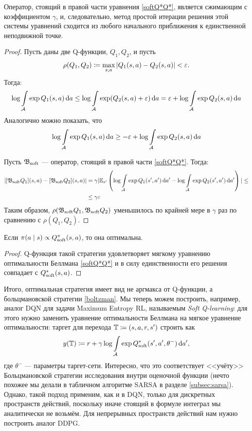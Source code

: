 \begin{theorem}
Оператор, стоящий в правой части уравнения \eqref{softQ*Q*}, является сжимающим с коэффициентом $\gamma$, и, следовательно, метод простой итерации решения этой системы уравнений сходится из любого начального приближения к единственной неподвижной точке.
\begin{proof}
Пусть даны две Q-функции, $Q_1, Q_2$, и пусть 
$$\rho(Q_1, Q_2) \coloneqq \max\limits_{s, a} | Q_1(s, a) \HM- Q_2(s, a) | \HM< \eps.$$
Тогда:
$$
\log \int\limits_{\mathcal{A}} \exp Q_1(s, a) \mathop{}\!\mathrm{d} a \le \log \int\limits_{\mathcal{A}} \exp (Q_2(s, a) + \varepsilon) \mathop{}\!\mathrm{d} a = \varepsilon + \log \int\limits_{\mathcal{A}} \exp Q_2(s, a) \mathop{}\!\mathrm{d} a
$$
Аналогично можно показать, что 
$$
\log \int\limits_{\mathcal{A}} \exp Q_1(s, a) \mathop{}\!\mathrm{d} a \ge -\varepsilon + \log \int\limits_{\mathcal{A}} \exp Q_2(s, a) \mathop{}\!\mathrm{d} a
$$

Пусть $\mathfrak{B}_{\mathrm{soft}}$ --- оператор, стоящий в правой части \eqref{softQ*Q*}. Тогда:
\begin{align*}
| [\mathfrak{B}_{\mathrm{soft}} Q_1](s, a) - [\mathfrak{B}_{\mathrm{soft}} Q_2](s, a) | &= \gamma | \mathbb{E}_{s'} \left( \log \int\limits_{\mathcal{A}} \exp Q_1(s', a') \mathop{}\!\mathrm{d} a' - \log \int\limits_{\mathcal{A}} \exp Q_2(s', a') \mathop{}\!\mathrm{d} a' \right) | \le \\ 
&\le \gamma \varepsilon
\end{align*}
Таким образом, $\rho(\mathfrak{B}_{\mathrm{soft}} Q_1, \mathfrak{B}_{\mathrm{soft}} Q_2)$ уменьшилось по крайней мере в $\gamma$ раз по сравнению с $\rho(Q_1, Q_2)$.
\end{proof}
\end{theorem}

\begin{proposition}
Если $\pi(a \mid s) \propto Q^{\pi}_{\mathrm{soft}}(s, a)$, то она оптимальна.
\begin{proof}
Q-функция такой стратегии удовлетворяет мягкому уравнению оптимальности Беллмана \eqref{softQ*Q*} и в силу единственности его решения совпадает с $Q^*_{\mathrm{soft}}(s, a)$.
\end{proof}
\end{proposition}

Итого, оптимальная стратегия имеет вид не аргмакса от Q-функции, а больцмановской стратегии \eqref{boltzman}. Мы теперь можем построить, например, аналог DQN для задачи Maximum Entropy RL, называемым \emph{Soft Q-learning}: для этого нужно заменить уравнение оптимальности Беллмана на мягкое уравнение оптимальности: таргет для перехода $\mathbb{T} \coloneqq (s, a, r, s')$ строить как
$$y(\mathbb{T}) \coloneqq r + \gamma \log \int\limits_{\mathcal{A}} \exp Q^*_{\mathrm{soft}}(s', a', \theta^{-}) \mathop{}\!\mathrm{d} a',$$
где $\theta^{-}$ --- параметры таргет-сети. Интересно, что это соответствует <<учёту>> Больцмановской стратегии исследования внутри оценочной функции (нечто похожее мы делали в табличном алгоритме SARSA в разделе \ref{subsec:sarsa}). Однако, такой подход применим, как и в DQN, только для дискретных пространств действий, поскольку иначе стоящий в формуле интеграл мы аналитически не возьмём. Для непрерывных пространств действий нам нужно построить аналог DDPG.

